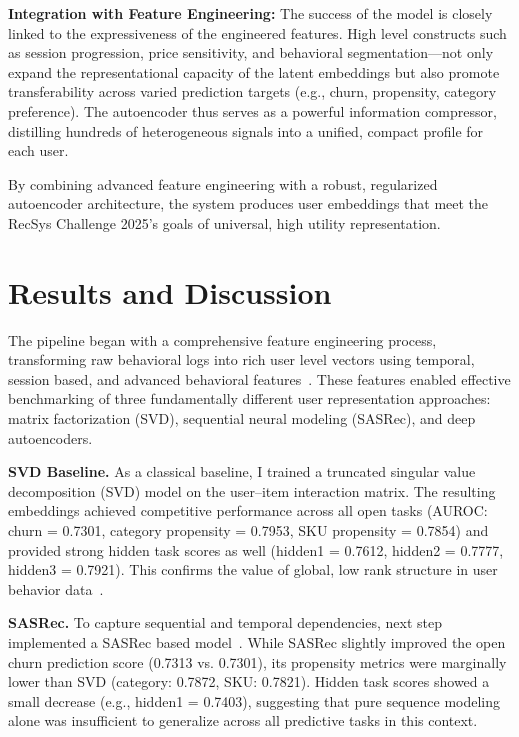 \documentclass[sigconf]{acmart}
\begin{document}
\textbf{Integration with Feature Engineering:}  
The success of the model is closely linked to the expressiveness of the engineered features. High level constructs such as session progression, price sensitivity, and behavioral segmentation—not only expand the representational capacity of the latent embeddings but also promote transferability across varied prediction targets (e.g., churn, propensity, category preference). The autoencoder thus serves as a powerful information compressor, distilling hundreds of heterogeneous signals into a unified, compact profile for each user.

By combining advanced feature engineering with a robust, regularized autoencoder architecture, the system produces user embeddings that meet the RecSys Challenge 2025’s goals of universal, high utility representation.

\section{Results and Discussion}
The pipeline began with a comprehensive feature engineering process, transforming raw behavioral logs into rich user level vectors using temporal, session based, and advanced behavioral features~\cite{Quadrana2018, Christoffel2022}. These features enabled effective benchmarking of three fundamentally different user representation approaches: matrix factorization (SVD), sequential neural modeling (SASRec), and deep autoencoders.

\textbf{SVD Baseline.}
As a classical baseline, I trained a truncated singular value decomposition (SVD) model on the user–item interaction matrix. The resulting embeddings achieved competitive performance across all open tasks (AUROC: churn = 0.7301, category propensity = 0.7953, SKU propensity = 0.7854) and provided strong hidden task scores as well (hidden1 = 0.7612, hidden2 = 0.7777, hidden3 = 0.7921). This confirms the value of global, low rank structure in user behavior data~\cite{Koren2009}.

\textbf{SASRec.}
To capture sequential and temporal dependencies,  next step implemented a SASRec based model~\cite{Kang2018}. While SASRec slightly improved the open churn prediction score (0.7313 vs. 0.7301), its propensity metrics were marginally lower than SVD (category: 0.7872, SKU: 0.7821). Hidden task scores showed a small decrease (e.g., hidden1 = 0.7403), suggesting that pure sequence modeling alone was insufficient to generalize across all predictive tasks in this context.
\end{document}
